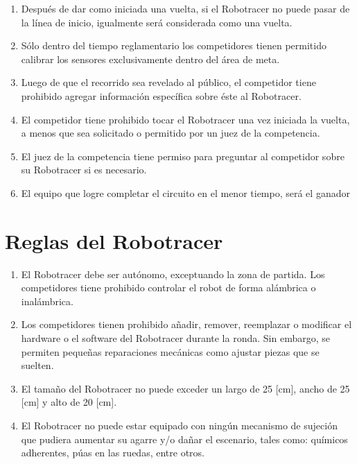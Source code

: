 \begin{enumerate}
  \item Después de dar como iniciada una vuelta, si el Robotracer no puede pasar de la línea de inicio, igualmente será considerada como una vuelta.

  \item Sólo dentro del tiempo reglamentario los competidores tienen permitido calibrar los sensores exclusivamente dentro del área de meta.

  \item Luego de que el recorrido sea revelado al público, el competidor tiene prohibido agregar información específica sobre éste al Robotracer.

  \item El competidor tiene prohibido tocar el Robotracer una vez iniciada la vuelta, a menos que sea solicitado o permitido por un juez de la competencia.

  \item El juez de la competencia tiene permiso para preguntar al competidor sobre su Robotracer si es necesario.

  \item El equipo que logre completar el circuito en el menor tiempo, será el ganador
\end{enumerate}


\section{Reglas del Robotracer}

\begin{enumerate}
  \item El Robotracer debe ser autónomo, exceptuando la zona de partida. Los competidores tiene prohibido controlar el robot de forma alámbrica o inalámbrica.

  \item Los competidores tienen prohibido añadir, remover, reemplazar o modificar el hardware o el software del Robotracer durante la ronda. Sin embargo, se permiten pequeñas reparaciones mecánicas como ajustar piezas que se suelten.

  \item El tamaño del Robotracer no puede exceder un largo de 25 [cm], ancho de 25 [cm] y alto de 20 [cm].

  \item El Robotracer no puede estar equipado con ningún mecanismo de sujeción que pudiera aumentar su agarre y/o dañar el escenario, tales como: químicos adherentes, púas en las ruedas, entre otros.
\end{enumerate}

